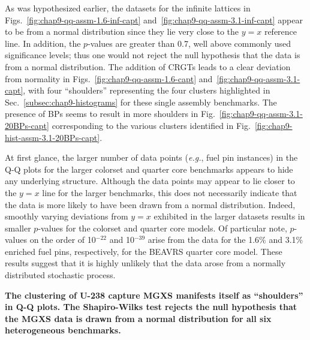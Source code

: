 As was hypothesized earlier, the datasets for the infinite lattices in Figs.~\ref{fig:chap9-qq-assm-1.6-inf-capt} and~\ref{fig:chap9-qq-assm-3.1-inf-capt} appear to be from a normal distribution since they lie very close to the $y = x$ reference line. In addition, the $p$-values are greater than 0.7, well above commonly used significance levels; thus one would not reject the null hypothesis that the data is from a normal distribution. The addition of \acp{CRGT} leads to a clear deviation from normality in Figs.~\ref{fig:chap9-qq-assm-1.6-capt} and~\ref{fig:chap9-qq-assm-3.1-capt}, with four ``shoulders'' representing the four clusters highlighted in Sec.~\ref{subsec:chap9-histograms} for these single assembly benchmarks. The presence of \acp{BP} seems to result in more shoulders in Fig.~\ref{fig:chap9-qq-assm-3.1-20BPs-capt} corresponding to the various clusters identified in Fig.~\ref{fig:chap9-hist-assm-3.1-20BPs-capt}. 

At first glance, the larger number of data points (\textit{e.g.}, fuel pin instances) in the \ac{Q-Q} plots for the larger colorset and quarter core benchmarks appears to hide any underlying structure. Although the data points may appear to lie closer to the $y = x$ line for the larger benchmarks, this does not necessarily indicate that the data is more likely to have been drawn from a normal distribution. Indeed, smoothly varying deviations from $y = x$ exhibited in the larger datasets results in smaller $p$-values for the colorset and quarter core models. Of particular note, $p$-values on the order of 10$^{-22}$ and 10$^{-39}$ arise from the data for the 1.6\% and 3.1\% enriched fuel pins, respectively, for the \ac{BEAVRS} quarter core model. These results suggest that it is highly unlikely that the data arose from a normally distributed stochastic process.


\begin{emphbox}
\textbf{The clustering of U-238 capture \ac{MGXS} manifests itself as ``shoulders'' in \ac{Q-Q} plots. The Shapiro-Wilks test rejects the null hypothesis that the \ac{MGXS} data is drawn from a normal distribution for all six heterogeneous benchmarks.}
\end{emphbox}

